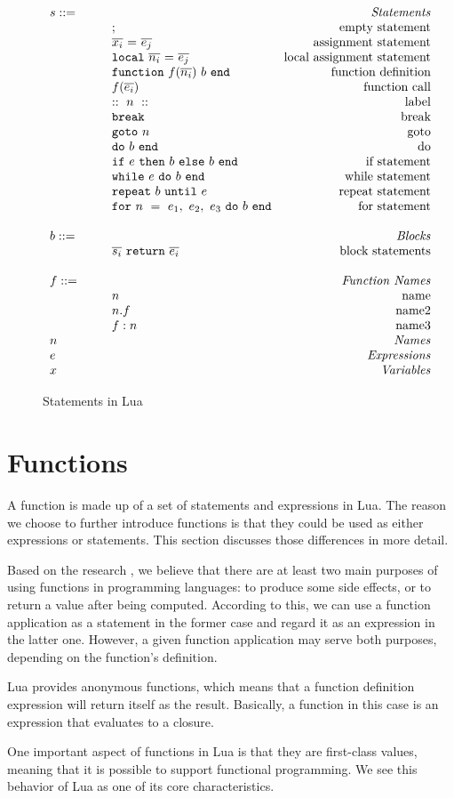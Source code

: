 \begin{figure}
\caption{Statements in Lua}
\label{fig:LuaStat}
\[
\begin{array}{llr}
\mydefhead{s ::=\qquad\qquad\qquad\qquad}{Statements}
\mydefcase{;}{empty statement}
\mydefcase{\assign x e}{assignment statement}
\mydefcase{\local n e}{local assignment statement}
\mydefcase{\function f n b}{function definition}
\mydefcase{f(\overline{e_i})}{function call}
\mydefcase{::~n~::}{label}
\mydefcase{\tt break}{break}
\mydefcase{{\tt goto} ~n}{goto}
\mydefcase{\doe b}{do}
\mydefcase{\ife e b b}{if statement}
\mydefcase{\whilee e b}{while statement}
\mydefcase{\repeate e b}{repeat statement}
\mydefcase{\for n e b}{for statement}
\\
\mydefhead{b ::=\qquad\qquad\qquad\qquad}{Blocks}
\mydefcase{\overline{s_i}~{\tt return}~\overline{e_i}}{block statements}
\\
\mydefhead{f ::=\qquad\qquad\qquad\qquad}{Function Names}
\mydefcase{n}{name}
\mydefcase{n.f}{name2}
\mydefcase{f:n}{name3}
\mydefhead{n \qquad\qquad\qquad\qquad}{Names}
\mydefhead{e \qquad\qquad\qquad\qquad}{Expressions}
\mydefhead{x \qquad\qquad\qquad\qquad}{Variables}
\end{array}
\]
\end{figure}

\section{Functions}
A function is made up of a set of statements and expressions in Lua. The reason we choose to further introduce functions is that they could be used as either expressions or statements.
This section discusses those differences in more detail.

Based on the research \cite{PIL}, we believe that there are at least two main purposes of using functions in programming languages: to produce some side effects, or to return a value after being computed. According to this, we can use a function application as a statement in the former case and regard it as an expression in the latter one. However, a given function application may serve both purposes, depending on the function's definition.

Lua provides anonymous functions, which means that a function definition expression will return itself as the result. Basically, a function in this case is an expression that evaluates to a closure.

One important aspect of functions in Lua is that they are first-class values, meaning that it is possible to support functional programming. We see this behavior of Lua as one of its core characteristics.

